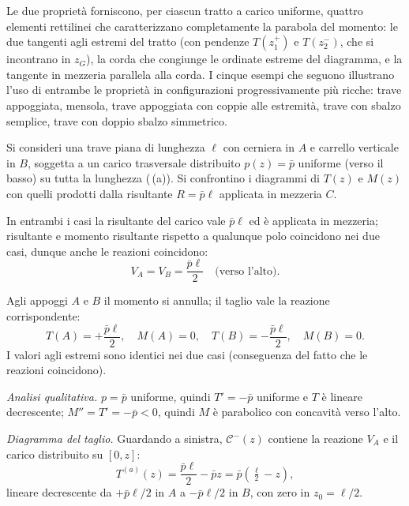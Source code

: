 Le due proprietà forniscono, per ciascun tratto a
carico uniforme, quattro elementi rettilinei che
caratterizzano completamente la parabola del
momento: le due tangenti agli estremi del tratto
(con pendenze $T(z_1^+)$ e $T(z_2^-)$, che si
incontrano in $z_G$), la corda che congiunge le
ordinate estreme del diagramma, e la tangente in
mezzeria parallela alla corda. I cinque esempi che
seguono illustrano l'uso di entrambe le proprietà in
configurazioni progressivamente più ricche: trave
appoggiata, mensola, trave appoggiata con coppie alle
estremità, trave con sbalzo semplice, trave con
doppio sbalzo simmetrico.




\begin{esempio}
	Si consideri una trave piana di lunghezza $\ell$
	con cerniera in $A$ e carrello verticale in $B$,
	soggetta a un carico trasversale distribuito
	$p(z) = \bar{p}$ uniforme (verso il basso) su
	tutta la lunghezza (\,(a)).
	Si confrontino i diagrammi di $T(z)$ e $M(z)$
	con quelli prodotti dalla risultante $R =
	\bar{p}\ell$ applicata in mezzeria $C$.
	
	\begin{svolgimento}
		
		
		In entrambi i casi la risultante del carico vale
		$\bar{p}\ell$ ed è applicata in mezzeria; risultante
		e momento risultante rispetto a qualunque polo
		coincidono nei due casi, dunque anche le reazioni
		coincidono:
		\[
		V_A = V_B = \frac{\bar{p}\ell}{2}
		\quad\text{(verso l'alto)}.
		\]
		
		Agli appoggi $A$ e $B$ il momento si annulla; il
		taglio vale la reazione corrispondente:
		\[
		T(A) = +\frac{\bar{p}\ell}{2}, \quad
		M(A) = 0, \quad
		T(B) = -\frac{\bar{p}\ell}{2}, \quad
		M(B) = 0.
		\]
		I valori agli estremi sono identici nei due casi
		(conseguenza del fatto che le reazioni coincidono).
		
		
		\textit{Analisi qualitativa.} $p = \bar p$ uniforme,
		quindi $T' = -\bar p$ uniforme e $T$ è lineare
		decrescente; $M'' = T' = -\bar p < 0$, quindi
		$M$ è parabolico con concavità verso l'alto.
		
		\textit{Diagramma del taglio.} Guardando a sinistra,
		$\mathcal{C}^-(z)$ contiene la reazione $V_A$ e
		il carico distribuito su $[0,z]$:
		\[
		T^{(a)}(z) = \frac{\bar{p}\ell}{2} - \bar{p}z
		= \bar{p}\!\left(\tfrac{\ell}{2}-z\right),
		\]
		lineare decrescente da $+\bar p\ell/2$ in $A$ a
		$-\bar p\ell/2$ in $B$, con zero in $z_0 = \ell/2$.
		

\end{svolgimento}
\end{esempio}
